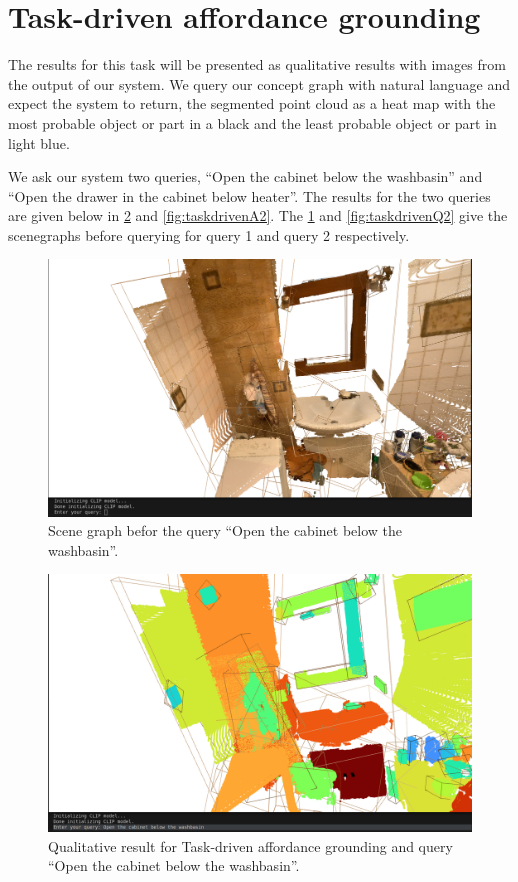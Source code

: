 \section{Task-driven affordance grounding}
\label{sec:TDAG}
The results for this task will be presented as qualitative results with images from the output of our system. We query our concept graph with natural language
 and expect the system to return, the segmented point cloud as a heat map with the most probable object or part in a black and 
 the least probable object or part in light blue. 

We ask our system two queries, \enquote{Open the cabinet below the washbasin} and \enquote{Open the drawer in the cabinet below heater}. 
The results for the two queries are given below in \cref{fig:taskdrivenA1} and \cref{fig:taskdrivenA2}. The \cref{fig:taskdrivenQ1} and \cref{fig:taskdrivenQ2} 
give the scenegraphs before querying for query 1 and query 2 respectively.

\begin{figure}[ht!]
    \centering
    \includegraphics[width=\textwidth]{content/images/results/taskdrivenQ1.png}
    \caption{Scene graph befor the query \enquote{Open the cabinet below the washbasin}.}
    \label{fig:taskdrivenQ1}
\end{figure}

\begin{figure}[ht!]
    \centering
    \includegraphics[width=\textwidth]{content/images/results/taskdrivenA1.png}
    \caption{Qualitative result for Task-driven affordance grounding and query \enquote{Open the cabinet below the washbasin}.}
    \label{fig:taskdrivenA1}
\end{figure}

